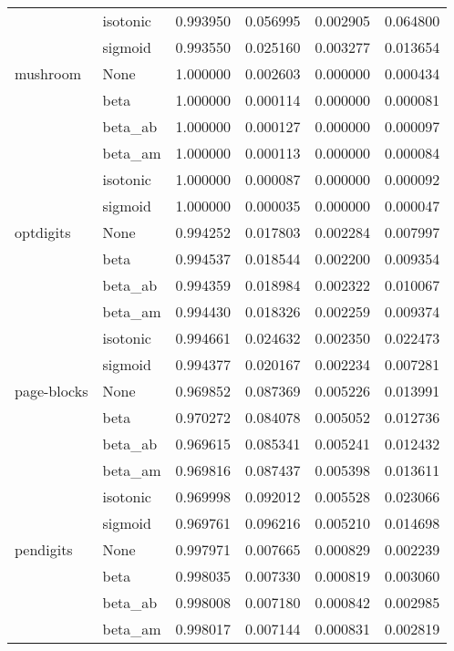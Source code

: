 \begin{tabular}{llrrrr}
        & isotonic &  0.993950 &  0.056995 &  0.002905 &  0.064800 \\
        & sigmoid &  0.993550 &  0.025160 &  0.003277 &  0.013654 \\
mushroom & None &  1.000000 &  0.002603 &  0.000000 &  0.000434 \\
        & beta &  1.000000 &  0.000114 &  0.000000 &  0.000081 \\
        & beta\_ab &  1.000000 &  0.000127 &  0.000000 &  0.000097 \\
        & beta\_am &  1.000000 &  0.000113 &  0.000000 &  0.000084 \\
        & isotonic &  1.000000 &  0.000087 &  0.000000 &  0.000092 \\
        & sigmoid &  1.000000 &  0.000035 &  0.000000 &  0.000047 \\
optdigits & None &  0.994252 &  0.017803 &  0.002284 &  0.007997 \\
        & beta &  0.994537 &  0.018544 &  0.002200 &  0.009354 \\
        & beta\_ab &  0.994359 &  0.018984 &  0.002322 &  0.010067 \\
        & beta\_am &  0.994430 &  0.018326 &  0.002259 &  0.009374 \\
        & isotonic &  0.994661 &  0.024632 &  0.002350 &  0.022473 \\
        & sigmoid &  0.994377 &  0.020167 &  0.002234 &  0.007281 \\
page-blocks & None &  0.969852 &  0.087369 &  0.005226 &  0.013991 \\
        & beta &  0.970272 &  0.084078 &  0.005052 &  0.012736 \\
        & beta\_ab &  0.969615 &  0.085341 &  0.005241 &  0.012432 \\
        & beta\_am &  0.969816 &  0.087437 &  0.005398 &  0.013611 \\
        & isotonic &  0.969998 &  0.092012 &  0.005528 &  0.023066 \\
        & sigmoid &  0.969761 &  0.096216 &  0.005210 &  0.014698 \\
pendigits & None &  0.997971 &  0.007665 &  0.000829 &  0.002239 \\
        & beta &  0.998035 &  0.007330 &  0.000819 &  0.003060 \\
        & beta\_ab &  0.998008 &  0.007180 &  0.000842 &  0.002985 \\
        & beta\_am &  0.998017 &  0.007144 &  0.000831 &  0.002819 \\

\end{tabular}
